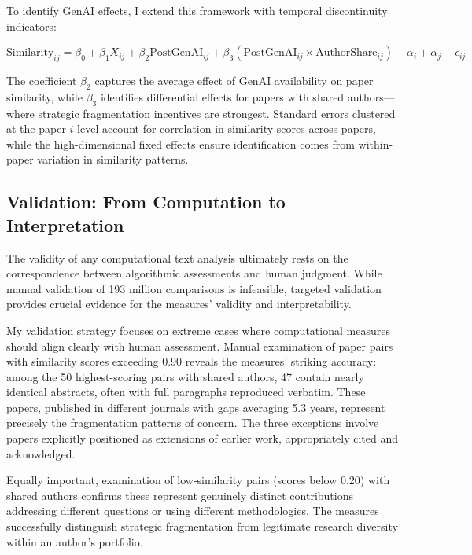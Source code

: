 \documentclass[12pt]{article}
\begin{document}
To identify GenAI effects, I extend this framework with temporal discontinuity indicators:

\begin{equation}
\text{Similarity}_{ij} = \beta_0 + \beta_1 X_{ij} + \beta_2 \text{PostGenAI}_{ij} + \beta_3 (\text{PostGenAI}_{ij} \times \text{AuthorShare}_{ij}) + \alpha_i + \alpha_j + \epsilon_{ij}
\end{equation}

The coefficient $\beta_2$ captures the average effect of GenAI availability on paper similarity, while $\beta_3$ identifies differential effects for papers with shared authors—where strategic fragmentation incentives are strongest. Standard errors clustered at the paper $i$ level account for correlation in similarity scores across papers, while the high-dimensional fixed effects ensure identification comes from within-paper variation in similarity patterns.

\subsection{Validation: From Computation to Interpretation}

The validity of any computational text analysis ultimately rests on the correspondence between algorithmic assessments and human judgment. While manual validation of 193 million comparisons is infeasible, targeted validation provides crucial evidence for the measures' validity and interpretability.

My validation strategy focuses on extreme cases where computational measures should align clearly with human assessment. Manual examination of paper pairs with similarity scores exceeding 0.90 reveals the measures' striking accuracy: among the 50 highest-scoring pairs with shared authors, 47 contain nearly identical abstracts, often with full paragraphs reproduced verbatim. These papers, published in different journals with gaps averaging 5.3 years, represent precisely the fragmentation patterns of concern. The three exceptions involve papers explicitly positioned as extensions of earlier work, appropriately cited and acknowledged.

Equally important, examination of low-similarity pairs (scores below 0.20) with shared authors confirms these represent genuinely distinct contributions addressing different questions or using different methodologies. The measures successfully distinguish strategic fragmentation from legitimate research diversity within an author's portfolio.
\end{document}
